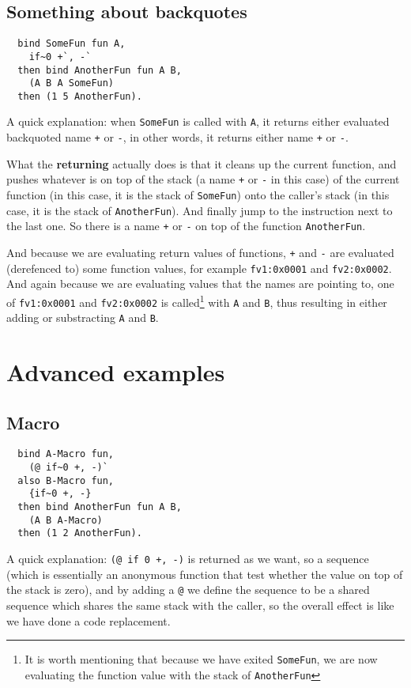 \documentclass{book}
\begin{document}
\subsection{Something about backquotes}
\label{ssec:backquote}
\begin{verbatim}
  bind SomeFun fun A,
    if~0 +`, -`
  then bind AnotherFun fun A B,
    (A B A SomeFun)
  then (1 5 AnotherFun).
\end{verbatim}

A quick explanation: when \texttt{SomeFun} is called with \texttt{A}, it returns either evaluated backquoted name \texttt{+} or \texttt{-}, in other words, it returns either name \texttt{+} or \texttt{-}.

What the \textbf{returning} actually does is that it cleans up the current function, and pushes whatever is on top of the stack (a name \texttt{+} or \texttt{-} in this case) of the current function (in this case, it is the stack of \texttt{SomeFun}) onto the caller's stack (in this case, it is the stack of \texttt{AnotherFun}). And finally jump to the instruction next to the last one. So there is a name \texttt{+} or \texttt{-} on top of the function \texttt{AnotherFun}.

And because we are evaluating return values of functions, \texttt{+} and \texttt{-} are evaluated (derefenced to) some function values, for example \texttt{fv1:0x0001} and \texttt{fv2:0x0002}. And again because we are evaluating values that the names are pointing to, one of \texttt{fv1:0x0001} and \texttt{fv2:0x0002} is called\footnote{It is worth mentioning that because we have exited \texttt{SomeFun}, we are now evaluating the function value with the stack of \texttt{AnotherFun}} with \texttt{A} and \texttt{B}, thus resulting in either adding or substracting \texttt{A} and \texttt{B}.

\section{Advanced examples}
\subsection{Macro}
\label{ssec:macro}
\begin{verbatim}
  bind A-Macro fun,
    (@ if~0 +, -)`
  also B-Macro fun,
    {if~0 +, -}
  then bind AnotherFun fun A B,
    (A B A-Macro)
  then (1 2 AnotherFun).
\end{verbatim}

A quick explanation: \texttt{(@ if~0 +, -)} is returned as we want, so a sequence (which is essentially an anonymous function that test whether the value on top of the stack is zero), and by adding a \texttt{@} we define the sequence to be a shared sequence which shares the same stack with the caller, so the overall effect is like we have done a code replacement.
\end{document}

